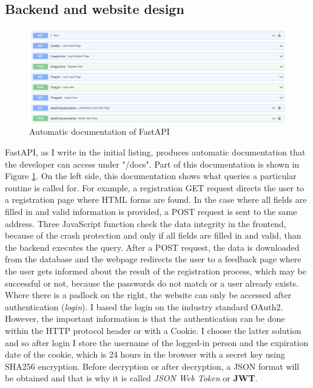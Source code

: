 \subsection{Backend and website design}
\begin{figure}[!htb]
    \centering
    \includegraphics[width=\textwidth]{img/backend.png}
    \caption{Automatic documentation of FastAPI}
    \label{fig:backend}
\end{figure}
\noindent
FastAPI, as I write in the initial listing, produces automatic documentation that the developer can access under "/docs". Part of this documentation is shown in Figure \ref{fig:backend}. On the left side, this documentation shows what queries a particular routine is called for. For example, a registration GET request directs the user to a registration page where HTML forms are found. In the case where all fields are filled in and valid information is provided, a POST request is sent to the same address. Three JavaScript function check the data integrity in the frontend, because of the crash protection and only if all fields are filled in and valid, than the backend executes the query. After a POST request, the data is downloaded from the database and the webpage redirects the user to a feedback page where the user gets informed about the result of the registration process, which may be successful or not, because the passwords do not match or a user already exists.\newline
Where there is a padlock on the right, the website can only be accessed after authentication (\textit{login}). I based the login on the industry standard OAuth2. However, the important information is that the authentication can be done within the HTTP protocol header or with a Cookie. I choose the latter solution and so after login I store the username of the logged-in person and the expiration date of the cookie, which is 24 hours in the browser with a secret key using SHA256 encryption. Before decryption or after decryption, a JSON format will be obtained and that is why it is called \textit{JSON Web Token} or \textbf{JWT}.


